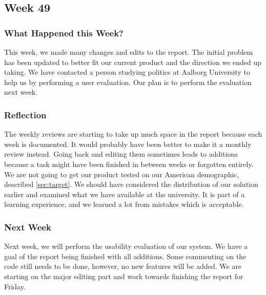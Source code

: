 \subsection{Week 49}
\subsubsection{What Happened this Week?}
This week, we made many changes and edits to the report. The initial problem has
been updated to better fit our current product and the direction we ended
up taking. We have contacted a person studying politics at Aalborg University to
help us by performing a user evaluation. Our plan is to perform the evaluation
next week.

\subsubsection{Reflection}
The weekly reviews are starting to take up much space in the report because each
week is documented. It would probably have been better to make it a monthly
review instead. Going back and editing them sometimes leads to additions because
a task might have been finished in between weeks or forgotten entirely. We are
not going to get our product tested on our American demographic, described
\autoref{sec:target}. We should have considered the distribution of our solution
earlier and examined what we have available at the university. It is part of a
learning experience, and we learned a lot from mistakes which is
acceptable.

\subsubsection{Next Week}
Next week, we will perform the usability evaluation of our system. We have
a goal of the report being finished with all additions. Some commenting on the code still
needs to be done, however, no new features will be added. We are starting on the
major editing part and work towards finishing the report for Friday.



% 
% 
% 
